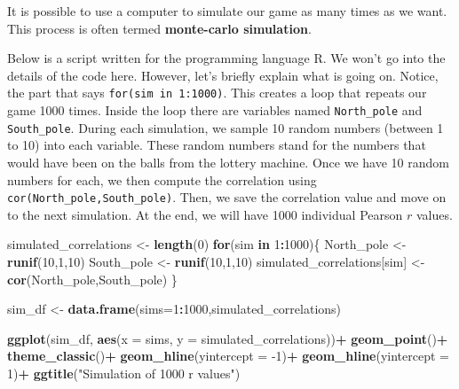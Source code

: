 \documentclass[]{book}
\newenvironment{Shaded}{\begin{snugshade}}{\end{snugshade}}
\newcommand{\ControlFlowTok}[1]{\textcolor[rgb]{0.13,0.29,0.53}{\textbf{#1}}}
\newcommand{\DataTypeTok}[1]{\textcolor[rgb]{0.13,0.29,0.53}{#1}}
\newcommand{\DecValTok}[1]{\textcolor[rgb]{0.00,0.00,0.81}{#1}}
\newcommand{\KeywordTok}[1]{\textcolor[rgb]{0.13,0.29,0.53}{\textbf{#1}}}
\newcommand{\NormalTok}[1]{#1}
\newcommand{\OperatorTok}[1]{\textcolor[rgb]{0.81,0.36,0.00}{\textbf{#1}}}
\newcommand{\StringTok}[1]{\textcolor[rgb]{0.31,0.60,0.02}{#1}}
\begin{document}
It is possible to use a computer to simulate our game as many times as we want. This process is often termed \textbf{monte-carlo simulation}.

Below is a script written for the programming language R. We won't go into the details of the code here. However, let's briefly explain what is going on. Notice, the part that says \texttt{for(sim\ in\ 1:1000)}. This creates a loop that repeats our game 1000 times. Inside the loop there are variables named \texttt{North\_pole} and \texttt{South\_pole}. During each simulation, we sample 10 random numbers (between 1 to 10) into each variable. These random numbers stand for the numbers that would have been on the balls from the lottery machine. Once we have 10 random numbers for each, we then compute the correlation using \texttt{cor(North\_pole,South\_pole)}. Then, we save the correlation value and move on to the next simulation. At the end, we will have 1000 individual Pearson \(r\) values.

\begin{Shaded}
\begin{Highlighting}[]
\NormalTok{simulated_correlations <-}\StringTok{ }\KeywordTok{length}\NormalTok{(}\DecValTok{0}\NormalTok{)}
\ControlFlowTok{for}\NormalTok{(sim }\ControlFlowTok{in} \DecValTok{1}\OperatorTok{:}\DecValTok{1000}\NormalTok{)\{}
\NormalTok{  North_pole <-}\StringTok{ }\KeywordTok{runif}\NormalTok{(}\DecValTok{10}\NormalTok{,}\DecValTok{1}\NormalTok{,}\DecValTok{10}\NormalTok{)}
\NormalTok{  South_pole <-}\StringTok{ }\KeywordTok{runif}\NormalTok{(}\DecValTok{10}\NormalTok{,}\DecValTok{1}\NormalTok{,}\DecValTok{10}\NormalTok{)}
\NormalTok{  simulated_correlations[sim] <-}\StringTok{ }\KeywordTok{cor}\NormalTok{(North_pole,South_pole)}
\NormalTok{\}}

\NormalTok{sim_df <-}\StringTok{ }\KeywordTok{data.frame}\NormalTok{(}\DataTypeTok{sims=}\DecValTok{1}\OperatorTok{:}\DecValTok{1000}\NormalTok{,simulated_correlations)}

\KeywordTok{ggplot}\NormalTok{(sim_df, }\KeywordTok{aes}\NormalTok{(}\DataTypeTok{x =}\NormalTok{ sims, }\DataTypeTok{y =}\NormalTok{ simulated_correlations))}\OperatorTok{+}
\StringTok{  }\KeywordTok{geom_point}\NormalTok{()}\OperatorTok{+}
\StringTok{  }\KeywordTok{theme_classic}\NormalTok{()}\OperatorTok{+}
\StringTok{  }\KeywordTok{geom_hline}\NormalTok{(}\DataTypeTok{yintercept =} \DecValTok{-1}\NormalTok{)}\OperatorTok{+}
\StringTok{  }\KeywordTok{geom_hline}\NormalTok{(}\DataTypeTok{yintercept =} \DecValTok{1}\NormalTok{)}\OperatorTok{+}
\StringTok{  }\KeywordTok{ggtitle}\NormalTok{(}\StringTok{"Simulation of 1000 r values"}\NormalTok{)}
\end{Highlighting}
\end{Shaded}
\end{document}
